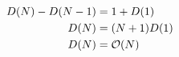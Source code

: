 \documentclass[english,11pt,openany]{article}
\theoremstyle{definition}
\newcommand{\bigO}{\mathcal{O}}
\theoremstyle{plain}
\theoremstyle{definition}
\begin{document}
\begin{appendices}
\begin{itemize}
	\begin{align}
	D(N) - D(N-1) & = 1 + D(1) \notag \\
	D(N) &= (N + 1)D(1) \notag \\
	D(N) & = \bigO(N) \notag 
	\end{align}
	 
\end{itemize}


\end{appendices}
\end{document}
